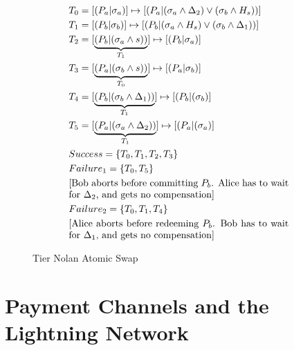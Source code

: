 \begin{figure}[!htb!]
    \centering
    \caption{Tier Nolan Atomic Swap}
    \label{fig:tier_nolan_atomic_swap}
\begin{align*}
    &T_0 = [(P_a|\sigma_a)] \mapsto [(P_a|(\sigma_a \land \Delta_2) \lor (\sigma_b \land H_{s}))] \\
    &T_1 = [(P_b|\sigma_b)] \mapsto [(P_b|(\sigma_a \land H_{s}) \lor (\sigma_b \land \Delta_1))] \\
    &T_2 = [\underbrace{(P_b|(\sigma_a \land s))}_{T_1}] \mapsto [(P_b|\sigma_a)]\\
    &T_3 = [\underbrace{(P_a|(\sigma_b \land s))}_{T_0}] \mapsto [(P_a|\sigma_b)]\\
    &T_4 = [\underbrace{(P_b|(\sigma_b \land \Delta_1))}_{T_1}] \mapsto [(P_b|(\sigma_b)] \\
    &T_5 = [\underbrace{(P_a|(\sigma_a \land \Delta_2))}_{T_1}] \mapsto [(P_a|(\sigma_a)] \\
    &Success = \{T_0, T_1, T_2, T_3\} \\
    &Failure_1 = \{T_0, T_5\} \\
    &\text{\parbox{8cm}{[Bob aborts before committing $P_b$. Alice has to wait for $\Delta_2$, and gets no compensation]}} \\
    &Failure_2 = \{T_0, T_1, T_4\} \\
    &\text{\parbox{8cm}{[Alice aborts before redeeming $P_b$. Bob has to wait for $\Delta_1$, and gets no compensation]}}
\end{align*}
\end{figure}

\section{Payment Channels and the Lightning Network}



